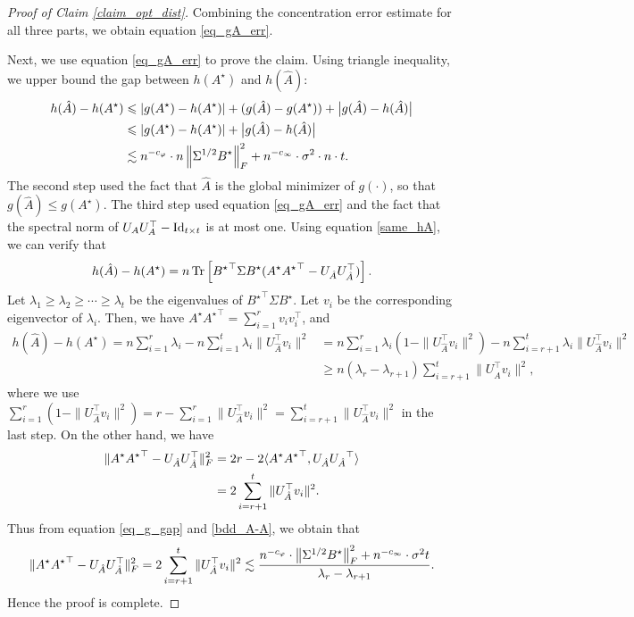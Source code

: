 \begin{proof}[Proof of Claim \ref{claim_opt_dist}]
	Combining the concentration error estimate for all three parts, we obtain equation \eqref{eq_gA_err}.

	\bigskip
	Next, we use equation \eqref{eq_gA_err} to prove the claim.
	Using triangle inequality, we upper bound the gap between $h(A^{\star})$ and $h(\hat{A})$:  
	\begin{align}
		h(\hat{A})- h(A^{\star})   &\leqslant {\left| {g(A^{\star}) - h(A^{\star})} \right|} + (g(\hat A) - g({A}^{\star})) + \big|g(\hat{A}) - h(\hat{A})\big| \nonumber \\
		&\leqslant {\left| {g(A^{\star}) - h(A^{\star})} \right|}  + \big|g(\hat{A}) - h(\hat{A})\big|\nonumber \\
		&\lesssim n^{-c_\varphi}\cdot n \left\| \Sigma^{1/2} B^{\star} \right\|_{F}^2 + n^{-c_\infty}\cdot \sigma^2 \cdot n \cdot t. \label{eq_g_gap}
	\end{align}
	The second step used the fact that $\hat A$ is the global minimizer of $g(\cdot)$, so that $g(\hat A) \le g({A}^\star)$.
	The third step used equation \eqref{eq_gA_err} and the fact that the spectral norm of $U_A U_A^{\top} - \operatorname{Id}_{t\times t}$ is at most one. 
	Using equation \eqref{same_hA}, we can verify that
	$$h(\hat A)-h(A^\star) = n \operatorname{Tr}\left[{B^\star}^\top\Sigma B^\star ( A^\star {A^\star}^\top -U_{\hat A}U^\top_{\hat A})\right] .$$
	Let $\lambda_1\ge\lambda_2 \ge \cdots\ge \lambda_t$ be the eigenvalues of ${B^\star}^\top\Sigma B^\star$.
	Let $v_i$ be the corresponding eigenvector of $\lambda_i$.
	Then, we have $A^\star {A^\star}^\top =\sum_{i=1}^r v_i v_i^\top$, and
	\begin{align}
	h(\hat A)-h(A^\star) = n \sum_{i=1}^r \lambda_i - n\sum_{i=1}^t \lambda_i \| U^\top_{\hat A} v_i\|^2 &= n\sum_{i=1}^r \lambda_i\left(1 -  \| U^\top_{\hat A} v_i\|^2\right)-n\sum_{i=r+1}^t \lambda_i \| U^\top_{\hat A} v_i\|^2 \nonumber\\
	&\ge  n(\lambda_r-\lambda_{r+1}) \sum_{i=r+1}^t \| U^\top_{\hat A} v_i\|^2 , \label{bdd_A-A}
	\end{align}
	where we use $\sum_{i=1}^r \left(1 -  \| U^\top_{\hat A} v_i\|^2\right) = r- \sum_{i=1}^r  \| U^\top_{\hat A} v_i\|^2 =\sum_{i=r+1}^t \| U^\top_{\hat A} v_i\|^2  $ in the last step.
	On the other hand, we have
	\begin{align*}
	\| A^\star {A^\star}^\top -U_{\hat A}U^\top_{\hat A}\|_F^2
	&= 2r - 2\langle A^{\star}{A^{\star}}^{\top}, U_{\hat{A}} {U_{\hat{A}}}^{\top} \rangle \\
	&= 2 \sum_{i=r+1}^t \| U^\top_{\hat A} v_i\|^2.
	\end{align*}
	Thus from equation \eqref{eq_g_gap} and  \eqref{bdd_A-A}, we obtain that
	$$\| A^\star {A^\star}^\top -U_{\hat A}U^\top_{\hat A}\|_F^2  =2 \sum_{i=r+1}^t \| U^\top_{\hat A} v_i\|^2 \lesssim \frac{n^{-c_\varphi}\cdot  \left\| \Sigma^{1/2} B^{\star} \right\|_{F}^2 + n^{-c_\infty}\cdot \sigma^2 t}{\lambda_r- \lambda_{r+1}}  .$$
	Hence the proof is complete.
	\end{proof}
	
